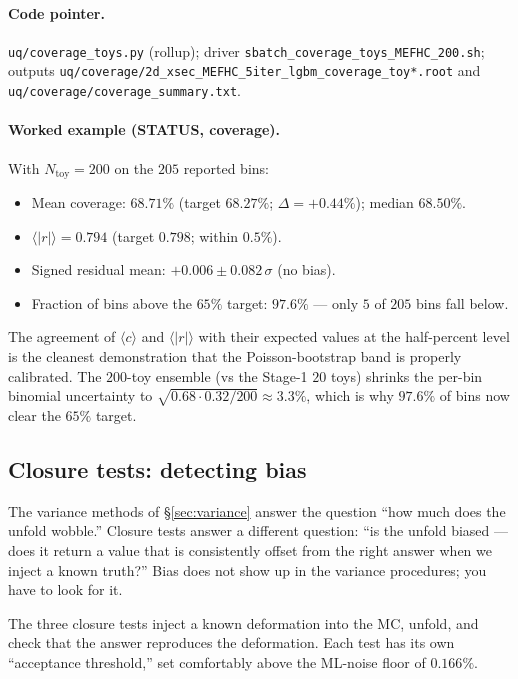 \paragraph{Code pointer.}
\begin{sloppypar}
\texttt{uq/coverage\_toys.py} (rollup); driver
\texttt{sbatch\_coverage\_toys\_MEFHC\_200.sh}; outputs
\texttt{uq/coverage/2d\_xsec\_MEFHC\_5iter\_lgbm\_coverage\_toy*.root}
and \texttt{uq/coverage/coverage\_summary.txt}.
\end{sloppypar}

\paragraph{Worked example (STATUS, coverage).}
With $N_{\text{toy}}=200$ on the $205$ reported bins:
\begin{itemize}[nosep]
  \item Mean coverage: $\boxed{68.71\%}$ (target $68.27\%$;
        $\Delta = +0.44\%$); median $68.50\%$.
  \item $\langle |r| \rangle = 0.794$ (target $0.798$; within $0.5\%$).
  \item Signed residual mean: $+0.006 \pm 0.082\,\sigma$ (no bias).
  \item Fraction of bins above the $65\%$ target: $\boxed{97.6\%}$ ---
        only $5$ of $205$ bins fall below.
\end{itemize}
The agreement of $\langle c \rangle$ and $\langle |r| \rangle$ with
their expected values at the half-percent level is the cleanest
demonstration that the Poisson-bootstrap band is properly calibrated.
The $200$-toy ensemble (vs the Stage-1 $20$ toys) shrinks the per-bin
binomial uncertainty to $\sqrt{0.68\cdot0.32/200}\approx 3.3\%$, which
is why $97.6\%$ of bins now clear the $65\%$ target.

\subsection{Closure tests: detecting bias}
\label{sec:closure}

The variance methods of \S\ref{sec:variance} answer the question
``how much does the unfold wobble.'' Closure tests answer a
different question: ``is the unfold biased --- does it return a value
that is consistently offset from the right answer when we inject a
known truth?'' Bias does not show up in the variance procedures; you
have to look for it.

The three closure tests inject a known deformation into the MC,
unfold, and check that the answer reproduces the deformation. Each
test has its own ``acceptance threshold,'' set comfortably above the
ML-noise floor of $0.166\%$.

